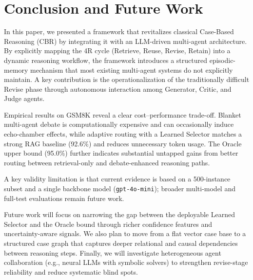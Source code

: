 \section{Conclusion and Future Work}
In this paper, we presented a framework that revitalizes classical Case-Based Reasoning (CBR) by integrating it with an LLM-driven multi-agent architecture. By explicitly mapping the 4R cycle (Retrieve, Reuse, Revise, Retain) into a dynamic reasoning workflow, the framework introduces a structured episodic-memory mechanism that most existing multi-agent systems do not explicitly maintain. A key contribution is the operationalization of the traditionally difficult Revise phase through autonomous interaction among Generator, Critic, and Judge agents.

Empirical results on GSM8K reveal a clear cost--performance trade-off. Blanket multi-agent debate is computationally expensive and can occasionally induce echo-chamber effects, while adaptive routing with a Learned Selector matches a strong RAG baseline (92.6\%) and reduces unnecessary token usage. The Oracle upper bound (95.0\%) further indicates substantial untapped gains from better routing between retrieval-only and debate-enhanced reasoning paths.

A key validity limitation is that current evidence is based on a 500-instance subset and a single backbone model (\texttt{gpt-4o-mini}); broader multi-model and full-test evaluations remain future work.

Future work will focus on narrowing the gap between the deployable Learned Selector and the Oracle bound through richer confidence features and uncertainty-aware signals. We also plan to move from a flat vector case base to a structured case graph that captures deeper relational and causal dependencies between reasoning steps. Finally, we will investigate heterogeneous agent collaboration (e.g., neural LLMs with symbolic solvers) to strengthen revise-stage reliability and reduce systematic blind spots.
